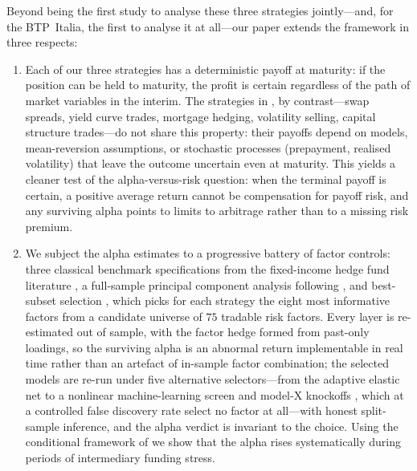Beyond being the first study to analyse these three strategies
jointly---and, for the BTP~Italia, the first to analyse it at
all---our paper extends the \citet{duarte2007risk} framework in three
respects:
\begin{enumerate}[label=\textbf{\arabic*.}, leftmargin=*, itemsep=4pt]

\item Each of our three strategies has a deterministic payoff at
  maturity: if the position can be held to maturity, the profit is
  certain regardless of the path of market variables in the interim.
  The strategies in \citet{duarte2007risk}, by contrast---swap
  spreads, yield curve trades, mortgage hedging, volatility selling,
  capital structure trades---do not share this property: their
  payoffs depend on models, mean-reversion assumptions, or stochastic
  processes (prepayment, realised volatility) that leave the outcome
  uncertain even at maturity. This yields a cleaner test
  of the alpha-versus-risk question: when the terminal payoff is
  certain, a positive average return cannot be compensation for
  payoff risk, and any surviving alpha points to limits to arbitrage
  rather than to a missing risk premium.

\item We subject the alpha estimates to a progressive battery of
  factor controls: three classical benchmark specifications from the
  fixed-income hedge fund literature \citep{duarte2007risk,
  fung2004hedge, brooks2020active}, a full-sample principal component
  analysis following \citet{connor1986performance, connor1988risk},
  and best-subset selection \citep{bertsimas2016best}, which picks
  for each strategy the eight most informative factors from a
  candidate universe of $75$ tradable risk factors. Every layer is
  re-estimated out of sample, with the factor hedge formed from
  past-only loadings, so the surviving alpha is an abnormal return
  implementable in real time rather than an artefact of in-sample
  factor combination; the selected models are re-run under five
  alternative selectors---from the adaptive elastic net
  \citep{zou2009adaptive} to a nonlinear machine-learning screen and
  model-X knockoffs \citep{candes2018panning}, which at a controlled
  false discovery rate select no factor at all---with honest
  split-sample inference, and the alpha verdict is invariant to the
  choice. Using the conditional framework of
  \citet{christopherson1998conditioning} we show that the alpha
  rises systematically during periods of intermediary funding
  stress.


\end{enumerate}
